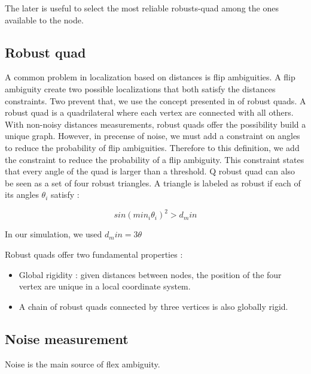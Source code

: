 \documentclass[letterpaper, 10 pt, conference]{ieeeconf}  %
\begin{document}
The later is useful to select the most reliable robusts-quad among the ones available to the node.


\subsection{Robust quad}
A common problem in localization based on distances is flip ambiguities. A flip ambiguity create two possible localizations that both satisfy the distances constraints. Two prevent that, we use the concept presented in \cite{MooreTeller} of robust quads.
A robust quad is a quadrilateral where each vertex are connected with all others.
With non-noisy distances measurements, robust quads offer the possibility build a unique graph. However, in precense of noise, we must add a constraint on angles to reduce the probability of flip ambiguities.
Therefore to this definition, we add the constraint to reduce the probability of a flip ambiguity. This constraint states that every angle of the quad is larger than a threshold. 
Q robust quad can also be seen as a set of four robust triangles. A triangle is labeled as robust if each of its angles $\theta_i$ satisfy : 

\begin{equation}
sin(min_i \theta_i)^2 > d_min
\end{equation}

In our simulation, we used $d_min = 3 \theta $



Robust quads offer two fundamental properties :
\begin{itemize}
\item Global rigidity : given distances between nodes, the position of the four vertex are unique in a local coordinate system.
\item A chain of robust quads connected by three vertices is also globally rigid.

\end{itemize}






\subsection{Noise measurement}
Noise is the main source of flex ambiguity. 
\end{document}
